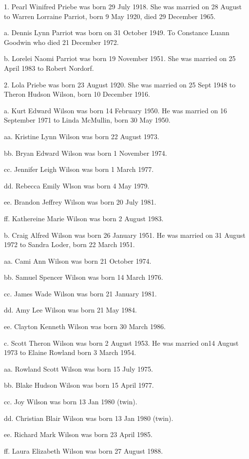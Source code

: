 \documentclass[a4paper]{article}
\begin{document}
1. Pearl Winifred Priebe was born 29 July 1918.  She was married on 28 August to Warren Lorraine Parriot, born 9 May 1920, died 29 December 1965.

a. Dennis Lynn Parriot was born on 31 October 1949.   To Constance Luann Goodwin who died 21 December  1972.

b. Lorelei  Naomi Parriot was born 19 November 1951.  She was married on 25 April 1983 to Robert Nordorf.

2. Lola Priebe was born 23 August 1920.  She was married on 25 Sept 1948 to Theron Hudson Wilson, born 10 December 1916.

a. Kurt Edward Wilson was born 14 February 1950.  He was married on 16 September 1971 to Linda McMullin, born 30 May 1950.

aa. Kristine Lynn Wilson was born 22 August 1973.

bb. Bryan Edward Wilson was born 1 November 1974.

cc. Jennifer Leigh Wilson was born 1 March 1977.

dd. Rebecca Emily Wlson was born 4 May 1979.

ee.  Brandon Jeffrey Wilson was born 20 July 1981.

ff.  Kathereine Marie Wilson was born 2 August 1983.  

b. Craig Alfred Wilson was born 26 January 1951.  He was married on 31 August 1972 to Sandra Loder, born 22 March 1951.

aa.  Cami Ann Wilson was born 21 October 1974.

bb. Samuel Spencer Wilson was born 14 March 1976.

cc. James Wade Wilson was born 21 January 1981.

dd. Amy Lee Wilson was born 21 May 1984.

ee. Clayton Kenneth Wilson was born 30 March 1986.

c. Scott Theron Wilson was born 2 August 1953.  He was married on14 August 1973 to Elaine Rowland born 3 March 1954.

aa. Rowland Scott Wilson was born 15 July 1975.

bb. Blake Hudson Wilson was born 15 April 1977.

cc. Joy Wilson was born 13 Jan 1980 (twin).

dd. Christian Blair Wilson was born 13 Jan 1980 (twin).

ee. Richard Mark Wilson was born 23 April 1985.

ff. Laura Elizabeth Wilson was born 27 August 1988.
\end{document}

